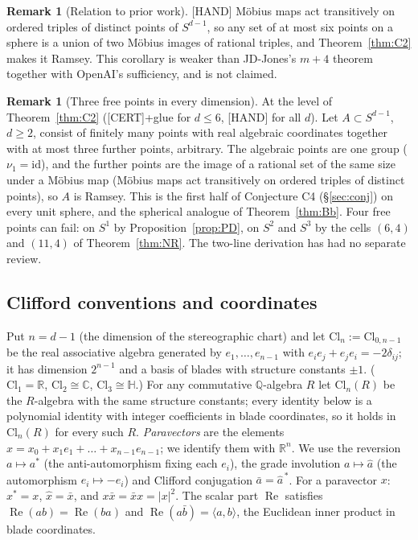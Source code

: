 \documentclass[11pt]{amsart}
\newcommand{\st}[1]{\textsf{[#1]}}
\newcommand{\Q}{\mathbb{Q}}
\newcommand{\R}{\mathbb{R}}
\newcommand{\C}{\mathbb{C}}
\newcommand{\HH}{\mathbb{H}}
\newcommand{\Cl}{\mathrm{Cl}}
\newcommand{\Rea}{\operatorname{Re}}
\theoremstyle{plain}
\theoremstyle{definition}
\newtheorem{remark}[theorem]{Remark}
\begin{document}
\begin{remark}[Relation to prior work]\label{rem:six}
\st{HAND} M\"obius maps act transitively on ordered triples of distinct points of $S^{d-1}$, so
any set of at most six points on a sphere is a union of two M\"obius images of rational triples, and
Theorem~\ref{thm:C2} makes it Ramsey. This corollary is weaker than JD-Jones's $m+4$ theorem
\cite{JDJones} together with OpenAI's sufficiency, and is not claimed.
\end{remark}

\begin{remark}[Three free points in every dimension]\label{rem:C4}
At the level of Theorem~\ref{thm:C2} (\st{CERT}+glue for $d\le6$, \st{HAND} for all $d$). Let
$A\subset S^{d-1}$, $d\ge2$, consist of finitely many points with real algebraic coordinates
together with at most three further points, arbitrary. The algebraic points are one group
($\nu_1=\mathrm{id}$), and the further points are the image of a rational set of the same size
under a M\"obius map (M\"obius maps act transitively on ordered triples of distinct points), so $A$
is Ramsey. This is the first half of Conjecture C4 (\S\ref{sec:conj}) on every unit sphere, and the
spherical analogue of Theorem~\ref{thm:Bb}. Four free points can fail: on $S^1$ by
Proposition~\ref{prop:PD}, on $S^2$ and $S^3$ by the cells $(6,4)$ and $(11,4)$ of
Theorem~\ref{thm:NR}. The two-line derivation has had no separate review.
\end{remark}

\subsection{Clifford conventions and coordinates}\label{sec:clifford}

Put $n=d-1$ (the dimension of the stereographic chart) and let $\Cl_n:=\Cl_{0,n-1}$ be the real
associative algebra generated by $e_1,\dots,e_{n-1}$ with $e_ie_j+e_je_i=-2\delta_{ij}$; it has
dimension $2^{n-1}$ and a basis of blades with structure constants $\pm1$. ($\Cl_1=\R$, $\Cl_2\cong\C$,
$\Cl_3\cong\HH$.) For any commutative $\Q$-algebra $R$ let $\Cl_n(R)$ be the $R$-algebra with the
same structure constants; every identity below is a polynomial identity with integer coefficients
in blade coordinates, so it holds in $\Cl_n(R)$ for every such $R$. \emph{Paravectors} are the
elements $x=x_0+x_1e_1+\dots+x_{n-1}e_{n-1}$; we identify them with $\R^n$. We use the reversion
$a\mapsto a^*$ (the anti-automorphism fixing each $e_i$), the grade involution $a\mapsto\hat a$
(the automorphism $e_i\mapsto-e_i$) and Clifford conjugation $\bar a=\hat a^{\,*}$. For a paravector
$x$: $x^*=x$, $\hat x=\bar x$, and $x\bar x=\bar xx=|x|^2$. The scalar part $\Rea$ satisfies
$\Rea(ab)=\Rea(ba)$ and $\Rea(a\bar b)=\langle a,b\rangle$, the Euclidean inner product in blade
coordinates.
\end{document}
